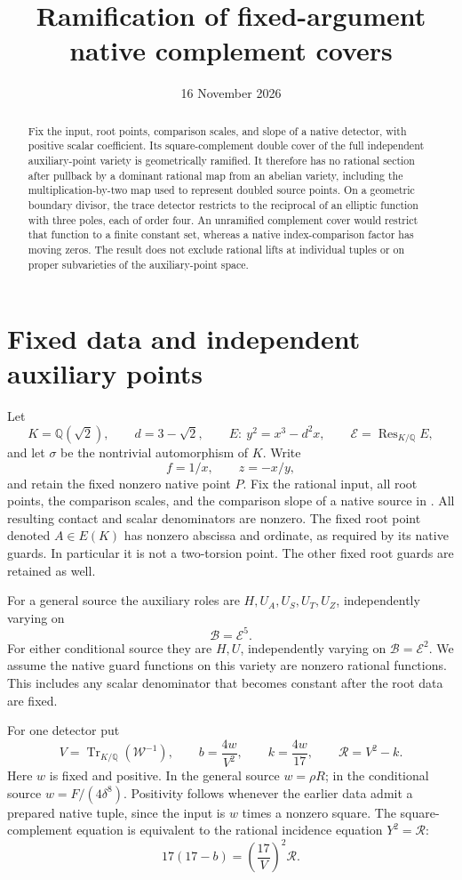 \documentclass[11pt,a4paper]{article}
\title{Ramification of fixed-argument native complement covers}
\author{}\date{16 November 2026}
\theoremstyle{remark}\newtheorem{remark}[theorem]{Remark}
\newcommand{\Q}{\mathbb Q}\newcommand{\Qbar}{\overline{\mathbb Q}}
\DeclareMathOperator{\Tr}{Tr}\DeclareMathOperator{\Res}{Res}
\begin{document}
\maketitle
\begin{abstract}
Fix the input, root points, comparison scales, and slope of a native
detector, with positive scalar coefficient. Its square-complement
double cover of the full independent auxiliary-point variety is
geometrically ramified. It therefore has no rational section after
pullback by a dominant rational map from an abelian variety, including
the multiplication-by-two map used to represent doubled source points.
On a geometric boundary divisor, the trace detector restricts to the
reciprocal of an elliptic function with three poles, each of order four.
An unramified complement cover would restrict that function to a finite
constant set, whereas a native index-comparison factor has moving zeros.
The result does not exclude rational lifts at individual tuples or on
proper subvarieties of the auxiliary-point space.
\end{abstract}

\section{Fixed data and independent auxiliary points}

Let
\[
 K=\Q(\sqrt2),\qquad d=3-\sqrt2,\qquad
 E:\ y^2=x^3-d^2x,\qquad \mathcal E=\Res_{K/\Q}E,
\]
and let $\sigma$ be the nontrivial automorphism of $K$. Write
\[
 f=1/x,\qquad z=-x/y,
\]
and retain the fixed nonzero native point $P$.
Fix the rational input, all root points, the comparison scales, and
the comparison slope of a native source in \cite{UnitNorm}.
All resulting contact and scalar denominators are nonzero. The fixed
root point denoted $A\in E(K)$ has nonzero abscissa and ordinate,
as required by its native guards. In particular it is not a two-torsion
point. The other fixed root guards are retained as well.

For a general source the auxiliary roles are
$H,U_A,U_S,U_T,U_Z$, independently varying on
\[
                         \mathcal B=\mathcal E^5.
\]
For either conditional source they are $H,U$, independently varying
on $\mathcal B=\mathcal E^2$. We assume the native guard functions
on this variety are nonzero rational functions. This includes any
scalar denominator that becomes constant after the root data are fixed.

For one detector put
\begin{equation}\label{eq:incidence}
 V=\Tr_{K/\Q}(\mathcal W^{-1}),\qquad
 b=\frac{4w}{V^2},\qquad k=\frac{4w}{17},
 \qquad \mathcal R=V^2-k.
\end{equation}
Here $w$ is fixed and positive. In the general source $w=\rho R$;
in the conditional source $w=F/(4\delta^8)$. Positivity follows
whenever the earlier data admit a prepared native tuple, since the
input is $w$ times a nonzero square. The square-complement equation is
equivalent to the rational incidence equation $Y^2=\mathcal R$:
\[
             17(17-b)=\left(\frac{17}{V}\right)^2\mathcal R.
\]
\end{document}
